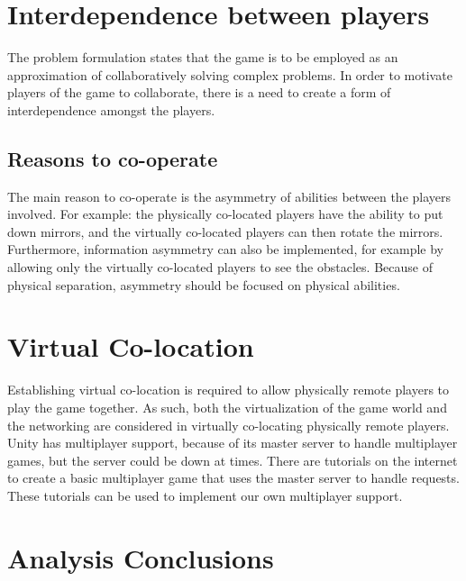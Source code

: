 	
	\section{Interdependence between players} \label{sec:interdependence}
		The problem formulation states that the game is to be employed as an 
		approximation of collaboratively solving complex problems. In order to
		motivate players of the game to collaborate, there is a need to create
		a form of interdependence amongst the players. 
		\subsection{Reasons to co-operate}
			The main reason to co-operate is the asymmetry of abilities between
			the players involved. For example: the physically co-located players
			have the ability to put down mirrors, and the virtually co-located
			players can then rotate the mirrors. Furthermore, information
			asymmetry can also be implemented, for example by allowing only the
			virtually co-located players to see the obstacles. Because of physical
			separation, asymmetry should be focused on physical abilities.
		
	\section{Virtual Co-location} \label{sec:virtualcolocation}
		Establishing virtual co-location is required to allow physically remote players
		to play the game together. As such, both the virtualization of the game world and
		the networking are considered in virtually co-locating physically remote players.
		Unity has multiplayer support, because of its master server to handle multiplayer
		games, but the server could be down at times. There are tutorials on the internet
		to create a basic multiplayer game that uses the master server to handle requests.
		These tutorials can be used to implement our own multiplayer support.
		
	\section{Analysis Conclusions} \label{sec:analysisconclusion}
